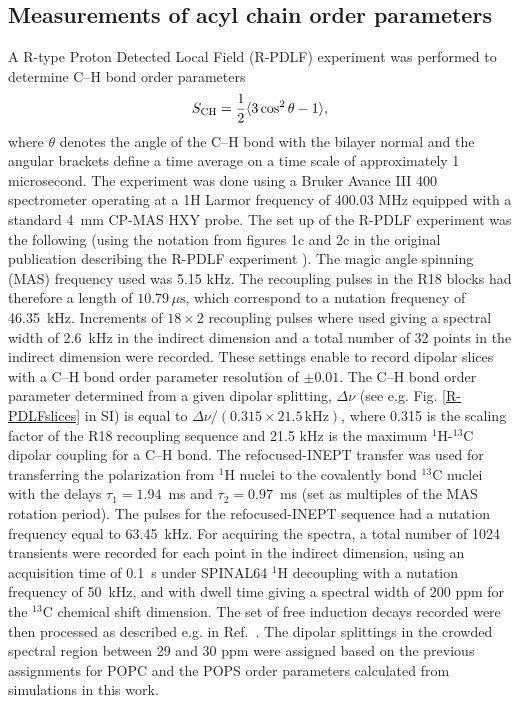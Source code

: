 \documentclass[journal=jpcbfk,manuscript=article]{achemso}
\begin{document}
\subsection{Measurements of acyl chain order parameters}
A R-type Proton Detected Local Field (R-PDLF) experiment was performed to determine C--H bond order
parameters
\begin{equation}\label{OPequation}
  S_{\rm{CH}}=\frac{1}{2}\langle3\cos^2\theta-1\rangle,
\end{equation}
  where $\theta$ denotes the angle of the C--H bond
with the bilayer normal and the angular brackets define a time average on a time scale of approximately 1 microsecond.
The experiment was done using a Bruker Avance III 400 spectrometer operating at a 1H Larmor frequency of 400.03 MHz
equipped with a standard 4~mm CP-MAS HXY probe. The set up of the R-PDLF experiment was the following
(using the notation from figures 1c and 2c in the original publication describing the R-PDLF experiment \cite{dvinskikh04}).
The magic angle spinning (MAS) frequency used was 5.15 kHz. The recoupling pulses in the R18 blocks had
therefore a length of $10.79 \, \mu \mathrm{s}$, which correspond to a nutation frequency of 46.35~kHz. Increments of $18 \times 2$ recoupling
pulses where used giving a spectral width of 2.6~kHz in the indirect dimension and a total number of 32 points in
the indirect dimension were recorded. These settings enable to record dipolar slices with a C--H bond order parameter
resolution of $\pm 0.01$. The C--H bond order parameter determined from a given dipolar
splitting, $\Delta \nu$ (see e.g. Fig. \ref{R-PDLFslices} in SI)
is equal to $\Delta \nu / (0.315 \times 21.5 \, \mathrm{kHz})$, where 0.315 is
the scaling factor of the R18 recoupling sequence and 21.5 kHz is the maximum $^1$H-$^{13}$C dipolar coupling for a C--H bond.
The refocused-INEPT transfer \cite{morris79,burum80} %
was used for transferring the polarization from $^1$H nuclei to the covalently bond $^{13}$C nuclei with the delays $\tau_1 = 1.94$~ms and $\tau_2 = 0.97$~ms
(set as multiples of the MAS rotation period). The pulses for the refocused-INEPT sequence had a nutation frequency equal to 63.45~kHz.
For acquiring the spectra, a total number of 1024 transients were recorded for each point in the indirect dimension, using an acquisition
time of 0.1~s under SPINAL64 $^1$H decoupling \cite{fung00} with a nutation frequency of 50~kHz, and with dwell time giving a spectral
width of 200 ppm for the $^{13}$C chemical shift dimension. The set of free induction decays recorded were then processed as
described e.g. in Ref.~. The dipolar splittings in the crowded spectral region
between 29 and 30 ppm were assigned based on the previous assignments for POPC \cite{ferreira13} 
and the POPS order parameters calculated from simulations in this work.
 
\end{document}
